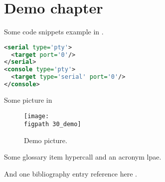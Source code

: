 \chapter{Demo chapter} \label{chap:demo}


Some code snippets example in .

\begin{lstlisting}[language=xml,label={lst:example},caption={Console device configuration in libvirt XML.},float=!ht]
<serial type='pty'>
  <target port='0'/>
</serial>
<console type='pty'>
  <target type='serial' port='0'/>
</console>
\end{lstlisting}


Some picture in 

\begin{figure}[H]
  \begin{center}
    \texttt{[image: \\figpath 30\_demo]}
    \caption{Demo picture.}
    \label{fig:example}
  \end{center}
\end{figure}


Some glossary item \gls{hypercall} and an acronym \gls{lpae}.


And one bibliography entry reference here \cite{Popek1974} .
